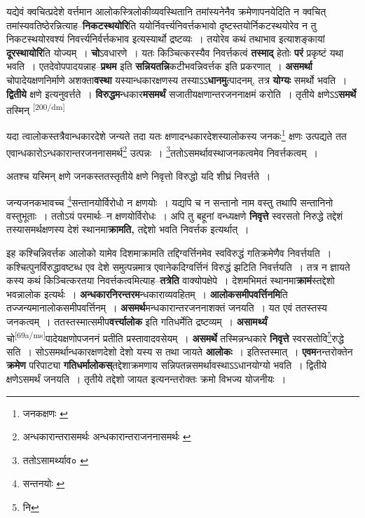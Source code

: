 \documentclass[article,12pt,a4paper]{memoir}
\begin{document}
	  \pstart यद्येवं क्वचित्प्रदेशे वर्त्तमान आलोकस्त्रिलोकीव्यवस्थितानि तमांस्यनेनैव क्रमेणापनयेदिति न क्वचित् तमांस्यवतिष्ठेरन्नित्याह--\textbf{निकटस्थयोरि}ति ययोर्निवर्त्त्यनिवर्त्तकभावो दृष्टस्तयोर्निकटस्थयोरेव न तु निकटस्थयोरवश्यं निवर्त्त्यनिर्वर्त्तकभाव इत्यस्यार्थो द्रष्टव्यः । तयोरेव कथं तथाभाव इत्याशङ्कायां \textbf{दूरस्थायोरि}ति योज्यम् । \textbf{चो}ऽवधारणे । यतः किञ्चित्करस्यैव निवर्त्तकत्वं \textbf{तस्माद्} हेतोः \textbf{परं} प्रकृष्टं यथा भवति । एतदेवोपपादयन्नाह--\textbf{प्रथम} इति \textbf{सन्नियतन्नि}कटीभवन्निवर्त्तक इति प्रकरणात् । \textbf{असमर्था} चोपादेयक्षणनिर्माणे अशक्ता\textbf{वस्था} यस्यान्धकारक्षणस्य तस्याऽऽ\textbf{धानमु}त्पादनम्, तत्र \textbf{योग्यः} समर्थो भवति । \textbf{द्वितीये} क्षणे इत्यनुवर्त्तते । \textbf{विरुद्धम}न्धकार\textbf{मसमर्थं} सजातीयक्षणान्तरजननाक्षमं करोति । तृतीये क्षणेऽऽ\textbf{समर्थे} तस्मिन्  \leavevmode\textsuperscript{\rmlatinfont\tiny [200/dm]} 
	  
	यदा त्वालोकस्तत्रैवान्धकारदेशे जन्यते तदा यतः क्षणादन्धकारदेशस्यालोकस्य जनकः\footnote{जनकक्षणः \cite{dp-msA} \cite{dp-msB} \cite{dp-edP} \cite{dp-edH} \cite{dp-edE} \cite{dp-edN}} क्षणः उत्पद्यते तत एवान्धकारोऽन्धकारान्तरजननासमर्थ\footnote{अन्धकारान्तरासमर्थः \cite{dp-msA} अन्धकारान्तराजननासमर्थः \cite{dp-msB} \cite{dp-msC}} उत्पन्नः । \footnote{ततोऽसामर्थ्याव० \cite{dp-msB}}ततोऽसमर्थावस्थाजनकत्वमेव निवर्त्तकत्वम् । 
	  
	अतश्च यस्मिन् क्षणे जनकस्ततस्तृतीये क्षणे निवृत्तो विरुद्धो यदि शीघ्रं निवर्त्तते । 
	  
	जन्यजनकभावच्च \footnote{सन्तनयोः \cite{dp-msA}}सन्तानयोर्विरोधो न क्षणयोः । यद्यपि च न सन्तानो नाम वस्तु तथापि सन्तानिनो वस्तुभूताः । ततोऽयं परमार्थः--न क्षणयोर्विरोधः । अपि तु बहूनां वन्ध्यक्षणे \textbf{निवृत्ते} स्वरसतो निरुद्धे तद्देशं तस्यासमर्थक्षणस्य देशं स्थानमा\textbf{क्रामति,} तद्देशो भवति निवर्त्तक इत्यर्थात् ।
	\pend
      

	  \pstart इह कश्चिन्निवर्त्तक आलोको यामेव दिशमाक्रामति तद्दिग्वर्त्तिनमेव स्वविरुद्धं गतिक्रमेणैव निवर्त्तयति । कश्चित्पुनर्विरुद्धावष्टब्ध एव देशे समुत्पन्नमात्र एवानेकदिग्वर्त्तिनं विरुद्धं झटिति निवर्त्तयति । तत्र न ज्ञायते कस्य कथं किञ्चित्करतया निवर्त्तकत्वमित्याह--\textbf{तत्रेति} वाक्योपक्षेपे । देशमभिमतं स्थानमा\textbf{क्रामं}स्तद्देशो भवन्नालोक इत्यर्थः । \textbf{अन्धकारनिरन्तरम}न्धकाराव्यवहितम् । \textbf{आलोकसमीपवर्त्तिनमि}ति तज्जन्यमानालोकसमीपवर्त्तिनम् । \textbf{असमर्थ}मन्धकारान्तरजननाशक्तं जनयति । यत एवं ततस्तस्य जनकत्वम् । ततस्तस्मात्समीप\textbf{वर्त्त्यालोक} इति गतिधर्मेति द्रष्टव्यम् । \textbf{असामर्थ्यं} चो\leavevmode\textsuperscript{\rmlatinfont\tiny [69a/ms]}पादेयक्षणोपजननं प्रतीति प्रस्तावादवसेयम् । \textbf{असमर्थे} तस्मिन्नन्धकारे \textbf{निवृत्ते} स्वरसतोवि\footnote{नि}रुद्धे सति । सोऽसमर्थान्धकारक्षणदेशो देशो यस्य स तथा जायते \textbf{आलोकः} । इतिस्तस्मात् । \textbf{एवम}नन्तरोक्तेन \textbf{क्रमेण} परिपाट्या \textbf{गतिधर्मालोकस्}तद्देशाक्रमणाय सन्निपतन्नसमर्थावस्थाऽऽधानयोग्यो भवति । द्वितीये क्षणेऽसमर्थं जनयति । तृतीये तद्देशो जायत इत्यनन्तरोक्तः क्रमो विभज्य योजनीयः ।
	\pend
      
\end{document}
